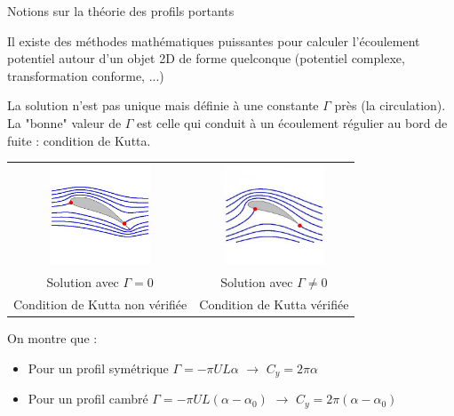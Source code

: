 \begin{frame}{Notions sur la théorie des profils portants}

\small
Il existe des méthodes mathématiques puissantes pour calculer l'écoulement potentiel autour d'un objet 2D de forme quelconque (potentiel complexe, transformation conforme, ...) 

\smallskip
\pause
La solution n'est pas unique mais définie à une constante $\Gamma$ près (la circulation).
\smallskip
\pause
La "bonne" valeur de $\Gamma$ est celle qui conduit à un écoulement régulier au bord de fuite : condition de Kutta.

\pause
\begin{center}
\begin{tabular}{cc}
\includegraphics[width=30mm]{Figures/Joukowski.jpeg}
&
\includegraphics[width=30mm]{Figures/Joukowski_Kutta.jpeg}
\\
Solution avec $\Gamma = 0$ & Solution avec  $\Gamma \ne 0$ \\
Condition de Kutta non vérifiée & Condition de Kutta vérifiée
\end{tabular}
\end{center}

\pause
\smallskip
On montre que :
\begin{itemize}
\item Pour un profil symétrique $\Gamma = - \pi U L \alpha $ \quad $\rightarrow$ \quad 
$C_y = 2 \pi \alpha$
\item Pour un profil cambré $\Gamma = - \pi U L (\alpha-\alpha_0) $ \quad $\rightarrow$ \quad 
$C_y = 2 \pi (\alpha-\alpha_0)$

\end{itemize}
\end{frame}


